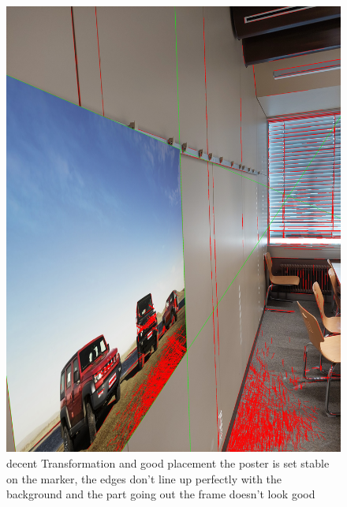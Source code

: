 \documentclass[a4paper,twocolumn]{article}
\begin{document}
\begin{figure}[h!]
\centering
\includegraphics[width=0.9\columnwidth]{img/20221115_113437.jpg} %
\caption{decent Transformation and good placement the poster is set stable on the marker, the edges don't line up perfectly with the background and the part going out the frame doesn't look good}
\label{fig:20221115_113437.jpg}
\end{figure}
\end{document}

